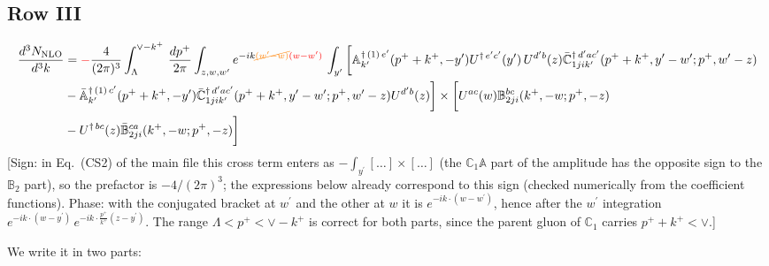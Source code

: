 \documentclass[9pt]{article}
\def\mf#1{\mathbb{#1}}
\numberwithin{equation}{section}
\begin{document}
 \subsection{Row III\,}
 \begin{align}
    \frac{d^{3}N_{\rm NLO}}{d^{3}k} & =   {\color{red}-}\frac{4}{(2\pi)^{3}} \int_{\Lambda}^{\vee -k^{+}}\, \frac{dp^{+}}{2\pi}\int_{z,w,w^{\prime}} e^{-ik{\color{orange}\cancel{(w^{\prime}-w)}}{\color{red}(w-w^{\prime})}}\,\int_{y^{\prime}}\bigg[\mf{A}^{\dagger\, (1)\,e^{\prime}}_{k^{\prime}}(p^{+}+k^{+},-y^{\prime})U^{\dagger\, e^{\prime}c^{\prime}}(y^{\prime})\,U^{d^{\prime}b}(z) \Bar{\mf{C}}^{\dagger\, d^{\prime}ac^{\prime}}_{1jik^{\prime}}(p^{+}+k^{+},y^{\prime}-w^{\prime}; p^{+},w^{\prime}-z)\notag \\ &  -\Bar{\mf{A}}^{\dagger\, (1)\,c^{\prime}}_{k^{\prime}}(p^{+}+k^{+},-y^{\prime}) \Bar{\mf{C}}^{\dagger\, d^{\prime}ac^{\prime}}_{1jik^{\prime}}(p^{+}+k^{+},y^{\prime}-w^{\prime}; p^{+},w^{\prime}-z)U^{d^{\prime}b}(z)\bigg] \times \bigg[U^{ac}(w) \mf{B}^{bc}_{2ji}(k^{+},-w;p^{+},-z)\notag \\ &  -U^{\dagger\, bc}(z)\Bar{\mf{B}}^{ca}_{2ji}(k^{+},-w; p^{+},-z)\bigg]\nonumber
\end{align} {\color{red}[Sign: in Eq.~(CS2) of the main file this cross term enters as $-\int_{y^{\prime}}[\dots]\times[\dots]$ (the $\mf{C}_1\mf{A}$ part of the amplitude has the opposite sign to the $\mf{B}_2$ part), so the prefactor is $-4/(2\pi)^3$; the expressions below already correspond to this sign (checked numerically from the coefficient functions). Phase: with the conjugated bracket at $w^{\prime}$ and the other at $w$ it is $e^{-ik\cdot(w-w^{\prime})}$, hence after the $w^{\prime}$ integration $e^{-ik\cdot(w-y^{\prime})}\,e^{-ik\cdot\frac{p^{+}}{k^{+}}(z-y^{\prime})}$. The range $\Lambda<p^{+}<\vee-k^{+}$ is correct for both parts, since the parent gluon of $\mf{C}_1$ carries $p^{+}+k^{+}<\vee$.]}\par\noindent 
We write it in two parts:
\end{document}
